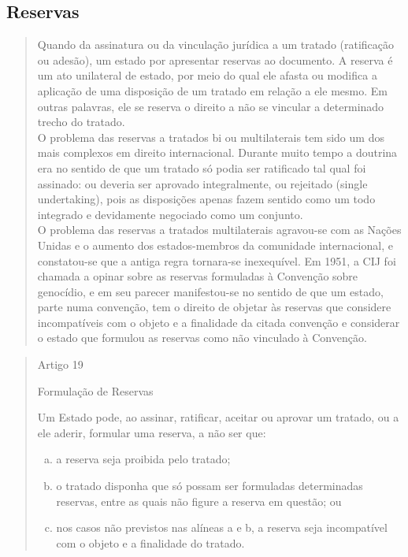 \documentclass{article}
\begin{document}
\subsection{Reservas}

\begin{quote}
    Quando da assinatura ou da vinculação jurídica a um tratado (ratificação ou adesão), um estado por apresentar reservas ao documento. A reserva é um ato unilateral de estado, por meio do qual ele afasta ou modifica a aplicação de uma disposição de um tratado em relação a ele mesmo. Em outras palavras, ele se reserva o direito a não se vincular a determinado trecho do tratado.\\

    O problema das reservas a tratados bi ou multilaterais tem sido um dos mais complexos em direito internacional. Durante muito tempo a doutrina era no sentido de que um tratado só podia ser ratificado tal qual foi assinado: ou deveria ser aprovado integralmente, ou rejeitado (single undertaking), pois as disposições apenas fazem sentido como um todo integrado e devidamente negociado como um conjunto.\\
    
    O problema das reservas a tratados multilaterais agravou-se com as Nações Unidas e o aumento dos estados-membros da comunidade internacional, e constatou-se que a antiga regra tornara-se inexequível. Em 1951, a CIJ foi chamada a opinar sobre as reservas formuladas à Convenção sobre genocídio, e em seu parecer manifestou-se no sentido de que um estado, parte numa convenção, tem o direito de objetar às reservas que considere incompatíveis com o objeto e a finalidade da citada convenção e considerar o estado que formulou as reservas como não vinculado à Convenção\cite[p.~162]{accioly_manual_2023}.
\end{quote}

\begin{quote}
    \begin{center}
         Artigo 19

        Formulação de Reservas 
    \end{center}    
    Um Estado pode, ao assinar, ratificar, aceitar ou aprovar um tratado, ou a ele aderir, formular uma reserva, a não ser que:
    \begin{enumerate}[a)]
        \item a reserva seja proibida pelo tratado; 
        \item o tratado disponha que só possam ser formuladas determinadas reservas, entre as quais não figure a reserva em questão; ou
        \item nos casos não previstos nas alíneas a e b, a reserva seja incompatível com o objeto e a finalidade do tratado.
    \end{enumerate}\cite{brasil_decreto_2009}
\end{quote}
\end{document}
